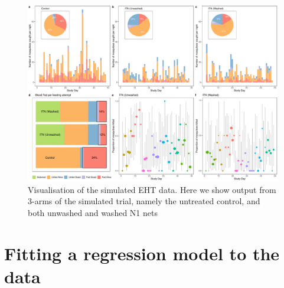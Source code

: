 \documentclass[11pt]{article}
\begin{document}
\begin{landscape}
\begin{figure}%
\centering
\includegraphics[scale=0.47]{Six_panel_figure.pdf}
\caption{Visualisation of the simulated EHT data. Here we show output from 3-arms of the simulated trial, namely the untreated control, and both unwashed and washed N1 nets}
\end{figure}
\end{landscape}

\section{Fitting a regression model to the data}
\end{document}
